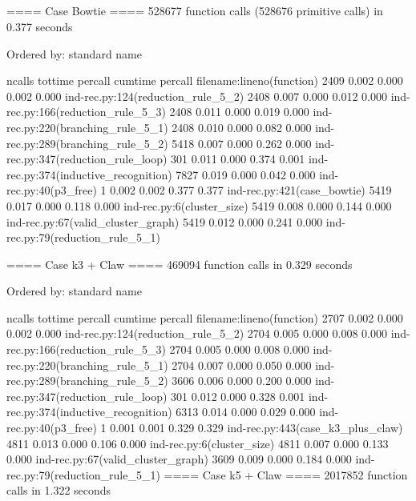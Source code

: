 \documentclass[11pt]{article}
\begin{document}
\subsection{}
\label{subsec:results} %

==== Case Bowtie ====
    528677 function calls (528676 primitive calls) in 0.377 seconds

   Ordered by: standard name

   ncalls  tottime  percall  cumtime  percall filename:lineno(function)
     2409    0.002    0.000    0.002    0.000 ind-rec.py:124(reduction_rule_5_2)
     2408    0.007    0.000    0.012    0.000 ind-rec.py:166(reduction_rule_5_3)
     2408    0.011    0.000    0.019    0.000 ind-rec.py:220(branching_rule_5_1)
     2408    0.010    0.000    0.082    0.000 ind-rec.py:289(branching_rule_5_2)
     5418    0.007    0.000    0.262    0.000 ind-rec.py:347(reduction_rule_loop)
      301    0.011    0.000    0.374    0.001 ind-rec.py:374(inductive_recognition)
     7827    0.019    0.000    0.042    0.000 ind-rec.py:40(p3_free)
        1    0.002    0.002    0.377    0.377 ind-rec.py:421(case_bowtie)
     5419    0.017    0.000    0.118    0.000 ind-rec.py:6(cluster_size)
     5419    0.008    0.000    0.144    0.000 ind-rec.py:67(valid_cluster_graph)
     5419    0.012    0.000    0.241    0.000 ind-rec.py:79(reduction_rule_5_1)

     ==== Case k3 + Claw ====
              469094 function calls in 0.329 seconds

        Ordered by: standard name

        ncalls  tottime  percall  cumtime  percall filename:lineno(function)
          2707    0.002    0.000    0.002    0.000 ind-rec.py:124(reduction_rule_5_2)
          2704    0.005    0.000    0.008    0.000 ind-rec.py:166(reduction_rule_5_3)
          2704    0.005    0.000    0.008    0.000 ind-rec.py:220(branching_rule_5_1)
          2704    0.007    0.000    0.050    0.000 ind-rec.py:289(branching_rule_5_2)
          3606    0.006    0.000    0.200    0.000 ind-rec.py:347(reduction_rule_loop)
           301    0.012    0.000    0.328    0.001 ind-rec.py:374(inductive_recognition)
          6313    0.014    0.000    0.029    0.000 ind-rec.py:40(p3_free)
             1    0.001    0.001    0.329    0.329 ind-rec.py:443(case_k3_plus_claw)
          4811    0.013    0.000    0.106    0.000 ind-rec.py:6(cluster_size)
          4811    0.007    0.000    0.133    0.000 ind-rec.py:67(valid_cluster_graph)
          3609    0.009    0.000    0.184    0.000 ind-rec.py:79(reduction_rule_5_1)
          ==== Case k5 + Claw ====
                   2017852 function calls in 1.322 seconds
\end{document}
